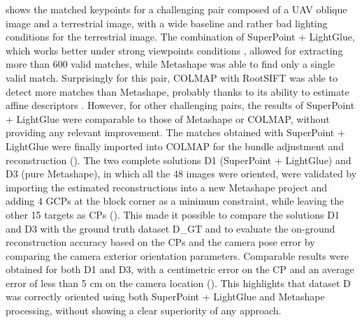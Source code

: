  shows the matched keypoints for a challenging pair composed of a UAV oblique image and a terrestrial image, with a wide baseline and rather bad lighting conditions for the terrestrial image. 
The combination of SuperPoint + LightGlue, which works better under strong viewpoints conditions \citep{ioli2024deep}, allowed for extracting more than 600 valid matches, while Metashape was able to find only a single valid match. Surprisingly for this pair, COLMAP with RootSIFT was able to detect more matches than Metashape, probably thanks to its ability to estimate affine descriptors \cite{Lindeberg1997_affine}. 
However, for other challenging pairs, the results of SuperPoint + LightGlue were comparable to those of Metashape or COLMAP, without providing any relevant improvement. The matches obtained with SuperPoint + LightGlue were finally imported into COLMAP for the bundle adjustment and reconstruction ().
The two complete solutions D1 (SuperPoint + LightGlue) and D3 (pure Metashape), in which all the 48 images were oriented, were validated by importing the estimated reconstructions into a new Metashape project and adding 4 GCPs at the block corner as a minimum constraint, while leaving the other 15 targets as CPs (). 
This made it possible to compare the solutions D1 and D3 with the ground truth dataset D\_GT and to evaluate the on-ground reconstruction accuracy based on the CPs and the camera pose error by comparing the camera exterior orientation parameters.
Comparable results were obtained for both D1 and D3, with a centimetric error on the CP and an average error of less than 5 cm on the camera location (). 
This highlights that dataset D was correctly oriented using both SuperPoint + LightGlue and Metashape processing, without showing a clear superiority of any approach. 

